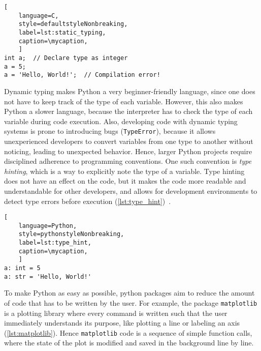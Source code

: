 \def\mycaption{ Example of static typing in C. The variable ``\texttt{a}'' is
    declared as an integer (\texttt{int}), and can only store integers. The
    variable ``\texttt{a}'' is then assigned the value 5, which is an integer.
    The variable ``\texttt{a}'' is then assigned the value \texttt{'Hello,
        World!'}, which is a string. This results in a compilation error, because
    the variable ``\texttt{a}'' can only store integers. Note that code after
    ``\texttt{//}'' is considered a comment and won't be executed. }
\begin{lstlisting}[
    language=C,
    style=defaultstyleNonbreaking,
    label=lst:static_typing,
    caption=\mycaption,
    ]
int a;  // Declare type as integer
a = 5;
a = 'Hello, World!';  // Compilation error!
\end{lstlisting}



Dynamic typing makes Python a very beginner-friendly language, since one does
not have to keep track of the type of each variable. However, this also makes
Python a slower language, because the interpreter has to check the type of each
variable during code execution. Also, developing code with dynamic typing
systems is prone to introducing bugs (\texttt{TypeError}), because it allows
unexperienced developers to convert variables from one type to another without
noticing, leading to unexpected behavior. Hence, larger Python projects require
disciplined adherence to programming conventions. One such convention is
\textit{type hinting}, which is a way to explicitly note the type of a
variable. Type hinting does not have an effect on the code, but it makes the
code more readable and understandable for other developers, and allows for
development environments to detect type errors before execution
(\autoref{lst:type_hint})~\cite{vanrossumPEP484Type2014}.

\def\mycaption{ Example of type hints used in Python. Explicitly stating the
    type of the variable is optional and does not change the behavior of the
    code, but behaves exactly as shown in \autoref{lst:dynamic_typing}.}
\begin{lstlisting}[
    language=Python,
    style=pythonstyleNonbreaking,
    label=lst:type_hint,
    caption=\mycaption,
    ]
a: int = 5
a: str = 'Hello, World!'
\end{lstlisting}



To make Python as easy as possible, python packages aim to reduce the amount of
code that has to be written by the user. For example, the package
\texttt{matplotlib} is a plotting library where every command is written such
that the user immediately understands its purpose, like plotting a line or
labeling an axis (\autoref{lst:matplotlib}). Hence \texttt{matplotlib} code is a
sequence of simple function calls, where the state of the plot is modified and
saved in the background line by line.

